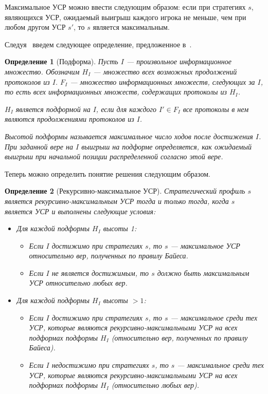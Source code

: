 \documentclass[14pt, a4paper]{extreport}
\newtheorem{definition}{\indent Определение}
\begin{document}
        Максимальное УСР можно ввести следующим образом: если при стратегиях $s$, являющихся УСР, ожидаемый выигрыш каждого игрока не меньше, чем при любом другом УСР $s'$, то $s$ является максимальным.

        Следуя~\cite{chen2017noncoop} введем следующее определение, предложенное в~\cite{kreps1982sequential}.
        \begin{definition}[Подформа]
            Пусть $I$ --- произвольное информационное множество. Обозначим $H_I$ --- множество всех возможных продолжений протоколов из $I$. $F_I$ --- множество информационных множеств, следующих за $I$, то есть всех информационных множеств, содержащих протоколы из $H_I$.

            $H_I$ является подформой на $I$, если для каждого $I' \in F_I$ все протоколы в нем являются продолжениями протоколов из $I$.

            Высотой подформы называется максимальное число ходов после достижения $I$. При заданной вере на $I$ выигрыш на подформе определяется, как ожидаемый выигрыш при начальной позиции распределенной согласно этой вере.
        \end{definition}

        Теперь можно определить понятие решения следующим образом.

        \begin{definition}[Рекурсивно-максимальное УСР]
            Стратегический профиль $s$ является рекурсивно-максимальным УСР тогда и только тогда, когда $s$ является УСР и выполнены следующие условия:
            \begin{itemize}
                \item Для каждой подформы $H_I$ высоты 1:
                    \begin{itemize}
                        \item Если $I$ достижимо при стратегиях $s$, то $s$ --- максимальное УСР относительно вер, полученных по правилу Байеса.
                        \item Если $I$ не является достижимым, то $s$ должно быть максимальным УСР относительно любых вер.
                    \end{itemize}
                \item Для каждой подформы $H_I$ высоты $>1$:
                    \begin{itemize}
                        \item Если $I$ достижимо при стратегиях $s$, то $s$ --- максимальное среди тех УСР, которые являются рекурсивно-максимальными УСР на всех подформах подформы $H_I$ (относительно вер, полученных по правилу Байеса).
                        \item Если $I$ недостижимо при стратегиях $s$, то $s$ --- максимальное среди тех УСР, которые являются рекурсивно-максимальными УСР на всех подформах подформы $H_I$ (относительно любых вер).
                    \end{itemize}
            \end{itemize}
        \end{definition}
\end{document}
